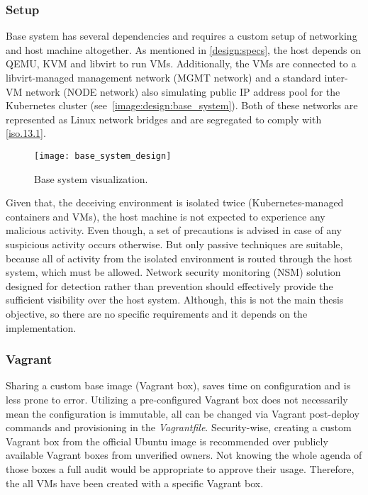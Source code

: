 \subsubsection*{Setup \label{design:env-arch:base:setup}}
Base system has several dependencies and requires a custom setup of networking and host machine altogether. As mentioned in \autoref{design:specs}, the host depends on QEMU, KVM and libvirt to run VMs. Additionally, the VMs are connected to a libvirt-managed management network (MGMT network) and a standard inter-VM network (NODE network) also simulating public IP address pool for the Kubernetes cluster (see~\autoref{image:design:base_system}). Both of these networks are represented as Linux network bridges and are segregated to comply with \ref{iso.13.1}.

\begin{figure}[h]
	\centering
	\texttt{[image: base\_system\_design]}
	\caption{Base system visualization.}
	\label{image:design:base_system}
\end{figure}

Given that, the deceiving environment is isolated twice (Kubernetes-managed containers and VMs), the host machine is not expected to experience any malicious activity. Even though, a set of precautions is advised in case of any suspicious activity occurs otherwise. But only passive techniques are suitable, because all of activity from the isolated environment is routed through the host system, which must be allowed. Network security monitoring (NSM) solution designed for detection rather than prevention should effectively provide the sufficient visibility over the host system. Although, this is not the main thesis objective, so there are no specific requirements and it depends on the implementation.

\subsubsection*{Vagrant \label{design:env-arch:base:vagrant}}
Sharing a custom base image (Vagrant box), saves time on configuration and is less prone to error. Utilizing a pre-configured Vagrant box does not necessarily mean the configuration is immutable, all can be changed via Vagrant post-deploy commands and provisioning in the \textit{Vagrantfile}. Security-wise, creating a custom Vagrant box from the official Ubuntu image is recommended over publicly available Vagrant boxes from unverified owners. Not knowing the whole agenda of those boxes a full audit would be appropriate to approve their usage. Therefore, the all VMs have been created with a specific Vagrant box.

